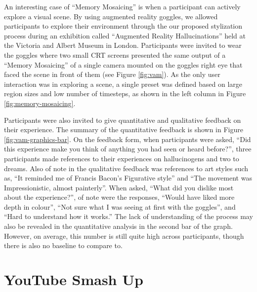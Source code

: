 \documentclass[a4paper,11pt,final]{ThesisStyle}
\begin{document}
An interesting case of ``Memory Mosaicing'' is when a participant can actively explore a visual scene.  By using augmented reality goggles, we allowed participants to explore their environment through the our proposed stylization process during an exhibition called ``Augmented Reality Hallucinations'' held at the Victoria and Albert Museum in London.  Participants were invited to wear the goggles where two small CRT screens presented the same output of a ``Memory Mosaicing'' of a single camera mounted on the goggles right eye that faced the scene in front of them (see Figure \ref{fig:vam}).  As the only user interaction was in exploring a scene, a single preset was defined based on large region sizes and low number of timesteps, as shown in the left column in Figure \ref{fig:memory-mosaicing}.  

Participants were also invited to give quantitative and qualitative feedback on their experience.  The summary of the quantitative feedback is shown in Figure \ref{fig:vam-graphics-bar}.  On the feedback form, when participants were asked, ``Did this experience make you think of anything you had seen or heard before?'', three participants made references to their experiences on hallucinogens and two to dreams.  Also of note in the qualitative feedback was references to art styles such as, ``It reminded me of Francis Bacon's Figurative style'' and ``The movement was Impressionistic, almost painterly''.  When asked, ``What did you dislike most about the experience?'', of note were the responses, ``Would have liked more depth in colour'', ``Not sure what I was seeing at first with the goggles'', and ``Hard to understand how it works.''  The lack of understanding of the process may also be revealed in the quantitative analysis in the second bar of the graph.  However, on average, this number is still quite high across participants, though there is also no baseline to compare to.  

\section{YouTube Smash Up}


\end{document}
